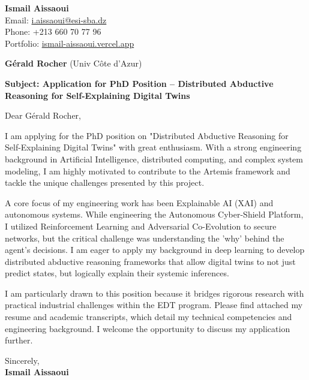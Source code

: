 \documentclass[11pt,a4paper]{article}
\begin{document}
\thispagestyle{empty}

\begin{flushright}
\textbf{Ismail Aissaoui} \\
Email: \href{mailto:i.aissaoui@esi-sba.dz}{i.aissaoui@esi-sba.dz} \\
Phone: +213 660 70 77 96 \\
Portfolio: \href{https://ismail-aissaoui.vercel.app}{ismail-aissaoui.vercel.app}
\end{flushright}

\vspace{1em}

\begin{flushleft}
\textbf{Gérald Rocher} (Univ Côte d'Azur)
\end{flushleft}

\vspace{1em}
\noindent\textbf{Subject: Application for PhD Position -- Distributed Abductive Reasoning for Self-Explaining Digital Twins}
\vspace{1em}

\noindent Dear Gérald Rocher,

\vspace{1em}
\noindent
I am applying for the PhD position on "Distributed Abductive Reasoning for Self-Explaining Digital Twins" with great enthusiasm. With a strong engineering background in Artificial Intelligence, distributed computing, and complex system modeling, I am highly motivated to contribute to the Artemis framework and tackle the unique challenges presented by this project.

\vspace{0.5em}
\noindent
A core focus of my engineering work has been Explainable AI (XAI) and autonomous systems. While engineering the Autonomous Cyber-Shield Platform, I utilized Reinforcement Learning and Adversarial Co-Evolution to secure networks, but the critical challenge was understanding the 'why' behind the agent's decisions. I am eager to apply my background in deep learning to develop distributed abductive reasoning frameworks that allow digital twins to not just predict states, but logically explain their systemic inferences.

\vspace{0.5em}
\noindent
I am particularly drawn to this position because it bridges rigorous research with practical industrial challenges within the EDT program. Please find attached my resume and academic transcripts, which detail my technical competencies and engineering background. I welcome the opportunity to discuss my application further.

\vspace{1.5em}
\noindent
Sincerely, \\[0.5em]
\textbf{Ismail Aissaoui}
\end{document}
